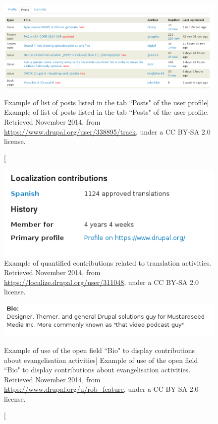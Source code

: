     \begin{figure}[H]
        \centering
        \includegraphics[scale=0.45]{img/profiles/posts.png}
        \caption[Example of list of posts listed in the tab ``Posts" of the user profile]%
        {Example of list of posts listed in the tab ``Posts" of the user profile. Retrieved  November 2014, from \url{https://www.drupal.org/user/338895/track}, under a CC BY-SA 2.0 license.}
        \label{profiles_posts}
    \end{figure}

    \begin{figure}[H]
        \centering
\includegraphics[scale=0.5]{img/profiles/translations_profile.png}
        \caption[Example of quantified contributions related to translation activities]%
        {Example of quantified contributions related to translation activities. Retrieved  November 2014, from \url{https://localize.drupal.org/user/311048}, under a CC BY-SA 2.0 license.}
        \label{profiles_translations}
    \end{figure}

    \begin{figure}[H]
        \centering
\includegraphics[scale=0.5]{img/profiles/profiles_bio2.png}
        \caption[Example of use of the open field ``Bio" to display contributions about evangelisation activities]%
        {Example of use of the open field ``Bio" to display contributions about evangelisation activities. Retrieved  November 2014, from \url{https://www.drupal.org/u/rob_feature}, under a CC BY-SA 2.0 license.}
        \label{profiles_bio2}
    \end{figure}

